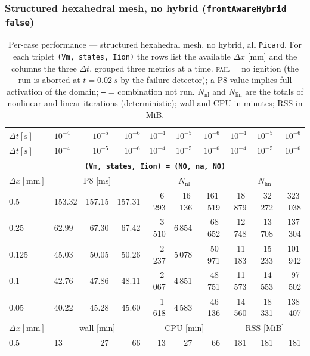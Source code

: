 \documentclass[11pt,a4paper]{article}
\newcommand{\code}[1]{\texttt{\small #1}}
\begin{document}
\subsubsection{Structured hexahedral mesh, no hybrid (\code{frontAwareHybrid false})}
\label{sec:res2d:hexaF}
\begin{center}\footnotesize
\begin{longtable}{l|lrr|rrr|rrr}
\caption{Per-case performance --- structured hexahedral mesh, no hybrid, all \code{Picard}. For each triplet \code{(Vm, states, Iion)} the rows list the available $\Delta x$ [mm] and the columns the three $\Delta t$, grouped three metrics at a time. \textsc{fail} = no ignition (the run is aborted at $t=\SI{0.02}{s}$ by the failure detector); a P8 value implies full activation of the domain; \texttt{--} = combination not run. $N_{\mathrm{nl}}$ and $N_{\mathrm{lin}}$ are the totals of nonlinear and linear iterations (deterministic); wall and CPU in minutes; RSS in MiB.}\label{tab:res2d:hexaF}\\
\toprule $ \Delta t [\text{s}]$ & $10^{-4}$ & $10^{-5}$ & $10^{-6}$ & $10^{-4}$ & $10^{-5}$ & $10^{-6}$ & $10^{-4}$ & $10^{-5}$ & $10^{-6}$\\ \midrule\endfirsthead
\toprule $ \Delta t [\text{s}]$ & $10^{-4}$ & $10^{-5}$ & $10^{-6}$ & $10^{-4}$ & $10^{-5}$ & $10^{-6}$ & $10^{-4}$ & $10^{-5}$ & $10^{-6}$\\ \midrule\endhead
\multicolumn{10}{c}{\textbf{\code{(Vm, states, Iion) = (NO, na, NO)}}}\\\hline
$ \Delta x [\text{mm}] $ & \multicolumn{3}{c|}{P8 [ms]} & \multicolumn{3}{c|}{$N_{\mathrm{nl}}$} & \multicolumn{3}{c|}{$N_{\mathrm{lin}}$}\\
0.5 & 153.32 & 157.15 & 157.31 & 6\,293 & 16\,136 & 161\,519 & 18\,879 & 32\,272 & 323\,038\\
0.25 & 62.99 & 67.30 & 67.42 & 3\,510 & 6\,854 & 68\,652 & 12\,748 & 13\,708 & 137\,304\\
0.125 & 45.03 & 50.05 & 50.26 & 2\,237 & 5\,078 & 50\,971 & 11\,183 & 15\,233 & 101\,942\\
0.1 & 42.76 & 47.86 & 48.11 & 2\,067 & 4\,851 & 48\,751 & 11\,573 & 14\,553 & 97\,502\\
0.05 & 40.22 & 45.28 & 45.60 & 1\,618 & 4\,583 & 46\,136 & 14\,560 & 18\,331 & 138\,407\\
\hline
$ \Delta x [\text{mm}] $ & \multicolumn{3}{c|}{wall [min]} & \multicolumn{3}{c|}{CPU [min]} & \multicolumn{3}{c|}{RSS [MiB]}\\
0.5 & 13 & 27 & 66 & 13 & 27 & 66 & 181 & 181 & 181\\

\end{longtable}
\end{center}
\end{document}
